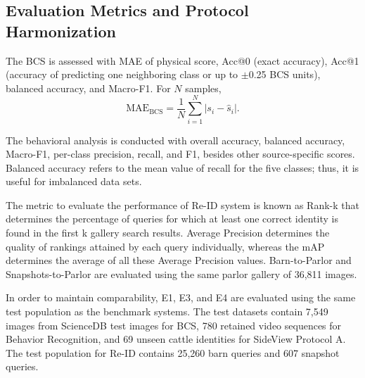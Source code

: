 

\subsection{Evaluation Metrics and Protocol Harmonization}

The BCS is assessed with MAE of physical score, Acc@0 (exact accuracy), Acc@1 (accuracy of predicting one neighboring class or up to $\pm$0.25 BCS units), balanced accuracy, and Macro-F1. For $N$ samples,
\begin{equation}
 \mathrm{MAE}_{\mathrm{BCS}}=\frac{1}{N}\sum_{i=1}^{N}|s_i-\hat{s}_i|.
\end{equation}

The behavioral analysis is conducted with overall accuracy, balanced accuracy, Macro-F1, per-class precision, recall, and F1, besides other source-specific scores. Balanced accuracy refers to the mean value of recall for the five classes; thus, it is useful for imbalanced data sets.

The metric to evaluate the performance of Re-ID system is known as Rank-k that determines the percentage of queries for which at least one correct identity is found in the first k gallery search results. Average Precision determines the quality of rankings attained by each query individually, whereas the mAP determines the average of all these Average Precision values. Barn-to-Parlor and Snapshots-to-Parlor are evaluated using the same parlor gallery of 36,811 images.

In order to maintain comparability, E1, E3, and E4 are evaluated using the same test population as the benchmark systems. The test datasets contain 7,549 images from ScienceDB test images for BCS, 780 retained video sequences for Behavior Recognition, and 69 unseen cattle identities for SideView Protocol A. The test population for Re-ID contains 25,260 barn queries and 607 snapshot queries.
